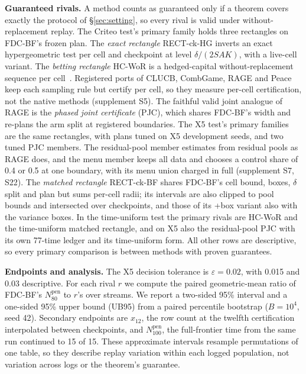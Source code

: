 \documentclass[sigconf,anonymous,review]{acmart}
\newcommand{\eps}{\varepsilon}
\newcommand{\Npen}{N_{80}^{\text{pen}}}
\begin{document}
\textbf{Guaranteed rivals.} A method counts as guaranteed only if a theorem covers exactly the protocol of \S\ref{sec:setting}, so every rival is valid under without-replacement replay. The Criteo test's primary family holds three rectangles on FDC-BF's frozen plan. The \emph{exact rectangle} RECT-ck-HG inverts an exact hypergeometric test per cell and checkpoint at level $\delta/(2SAK)$, with a live-cell variant. The \emph{betting rectangle} HC-WoR is a hedged-capital without-replacement sequence per cell~\citep{waudbysmith2020confidence,waudbysmith2024estimating}. Registered ports of CLUCB, CombGame, RAGE and Peace keep each sampling rule but certify per cell, so they measure per-cell certification, not the native methods (supplement S5). The faithful valid joint analogue of RAGE is the \emph{phased joint certificate} (PJC), which shares FDC-BF's width and re-plans the arm split at registered boundaries. The X5 test's primary families are the same rectangles, with plans tuned on X5 development seeds, and two tuned PJC members. The residual-pool member estimates from residual pools as RAGE does, and the menu member keeps all data and chooses a control share of 0.4 or 0.5 at one boundary, with its menu union charged in full (supplement S7, S22). The \emph{matched rectangle} RECT-ck-BF shares FDC-BF's cell bound, boxes, $\delta$ split and plan but sums per-cell radii; its intervals are also clipped to pool bounds and intersected over checkpoints, and those of its +box variant also with the variance boxes. In the time-uniform test the primary rivals are HC-WoR and the time-uniform matched rectangle, and on X5 also the residual-pool PJC with its own 77-time ledger and its time-uniform form. All other rows are descriptive, so every primary comparison is between methods with proven guarantees.

\textbf{Endpoints and analysis.} The X5 decision tolerance is $\eps = 0.02$, with 0.015 and 0.03 descriptive. For each rival $r$ we compute the paired geometric-mean ratio of FDC-BF's $\Npen$ to $r$'s over streams. We report a two-sided 95\% interval and a one-sided 95\% upper bound (UB95) from a paired percentile bootstrap ($B = 10^4$, seed 42). Secondary endpoints are $x_{12}$, the row count at the twelfth certification interpolated between checkpoints, and $N_{100}^{\text{pen}}$, the full-frontier time from the same run continued to 15 of 15. These approximate intervals resample permutations of one table, so they describe replay variation within each logged population, not variation across logs or the theorem's guarantee.
\end{document}
